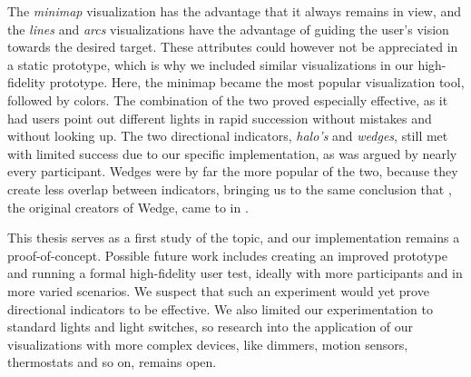The \textit{minimap} visualization has the advantage that it always remains in view, and the \textit{lines} and \textit{arcs} visualizations have the advantage of guiding the user's vision towards the desired target. These attributes could however not be appreciated in a static prototype, which is why we included similar visualizations in our high-fidelity prototype. Here, the minimap became the most popular visualization tool, followed by colors. The combination of the two proved especially effective, as it had users point out different lights in rapid succession without mistakes and without looking up. The two directional indicators, \textit{halo's} and \textit{wedges}, still met with limited success due to our specific implementation, as was argued by nearly every participant. Wedges were by far the more popular of the two, because they create less overlap between indicators, bringing us to the same conclusion that \citeauthor{gustafson2008wedge}, the original creators of Wedge, came to in \citeyear{gustafson2008wedge} \cite{gustafson2008wedge}.

This thesis serves as a first study of the topic, and our implementation remains a proof-of-concept. Possible future work includes creating an improved prototype and running a formal high-fidelity user test, ideally with more participants and in more varied scenarios. We suspect that such an experiment would yet prove directional indicators to be effective. We also limited our experimentation to standard lights and light switches, so research into the application of our visualizations with more complex devices, like dimmers, motion sensors, thermostats and so on, remains open.


